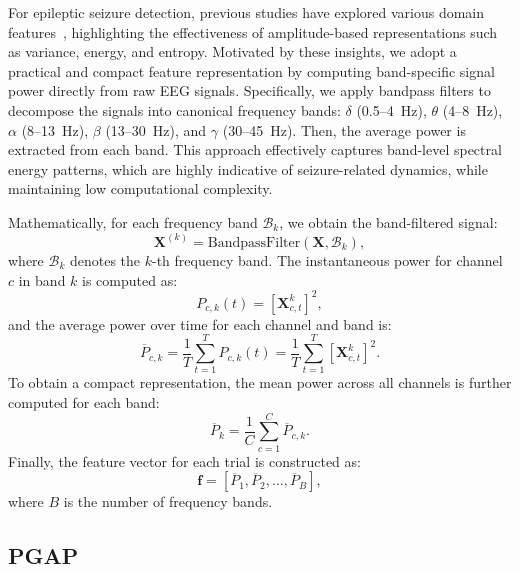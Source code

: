 \documentclass[journal,twocolumn]{IEEEtran}
\begin{document}
For epileptic seizure detection, previous studies have explored various domain features~\cite{wang2023tasa,boonyakitanont2020review}, highlighting the effectiveness of amplitude-based representations such as variance, energy, and entropy. Motivated by these insights, we adopt a practical and compact feature representation by computing band-specific signal power directly from raw EEG signals. Specifically, we apply bandpass filters to decompose the signals into canonical frequency bands: $\delta$ (0.5--4~Hz), $\theta$ (4--8~Hz), $\alpha$ (8--13~Hz), $\beta$ (13--30~Hz), and $\gamma$ (30--45~Hz). Then, the average power is extracted from each band. This approach effectively captures band-level spectral energy patterns, which are highly indicative of seizure-related dynamics, while maintaining low computational complexity.

Mathematically, for each frequency band $\mathcal{B}_k$, we obtain the band-filtered signal:
\begin{equation}
    \mathbf{X}^{(k)} = \mathrm{BandpassFilter}(\mathbf{X}, \mathcal{B}_k),
    \label{eq:band_filter}
\end{equation}
where $\mathcal{B}_k$ denotes the $k$-th frequency band. The instantaneous power for channel $c$ in band $k$ is computed as:
\begin{equation}
    P_{c,k}(t) = \left[\mathbf{X}^{k}_{c, t}\right]^2,
    \label{eq:inst_power}
\end{equation}
and the average power over time for each channel and band is:
\begin{equation}
    \overline{P}_{c,k} = \frac{1}{T} \sum_{t=1}^{T} P_{c,k}(t) = \frac{1}{T} \sum_{t=1}^{T} \left[\mathbf{X}^{k}_{c, t}\right]^2.
    \label{eq:avg_band_power}
\end{equation}
To obtain a compact representation, the mean power across all channels is further computed for each band:
\begin{equation}
    \overline{P}_{k} = \frac{1}{C} \sum_{c=1}^{C} \overline{P}_{c,k}.
    \label{eq:pool_band_power}
\end{equation}
Finally, the feature vector for each trial is constructed as:
\begin{equation}
    \mathbf{f} = [\overline{P}_{1}, \overline{P}_{2}, \ldots, \overline{P}_{B}],
    \label{eq:feature_vector_band_power}
\end{equation}
where $B$ is the number of frequency bands.


\subsection{PGAP}
\label{subsec:PGAP}
\end{document}
